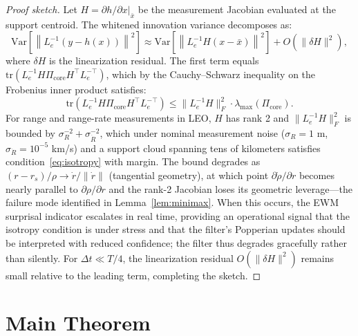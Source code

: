\documentclass[12pt]{article}
\begin{document}
\begin{proof}[Proof sketch]
Let $H = \partial h/\partial x|_{\bar{x}}$ be the measurement Jacobian evaluated at the support centroid. The whitened innovation variance decomposes as:
\[
\mathrm{Var}\!\left[\left\|L_e^{-1}(y - h(x))\right\|^2\right] \approx \mathrm{Var}\!\left[\left\|L_e^{-1}H(x - \bar{x})\right\|^2\right] + O(\|\delta H\|^2),
\]
where $\delta H$ is the linearization residual. The first term equals $\mathrm{tr}(L_e^{-1}H\Pi_{\mathrm{core}}H^\top L_e^{-\top})$, which by the Cauchy--Schwarz inequality on the Frobenius inner product satisfies:
\[
\mathrm{tr}(L_e^{-1}H\Pi_{\mathrm{core}}H^\top L_e^{-\top}) \leq \|L_e^{-1}H\|_F^2 \cdot \lambda_{\max}(\Pi_{\mathrm{core}}).
\]
For range and range-rate measurements in LEO, $H$ has rank 2 and $\|L_e^{-1}H\|_F^2$ is bounded by $\sigma_R^{-2} + \sigma_{\dot{R}}^{-2}$, which under nominal measurement noise ($\sigma_R = 1$ m, $\sigma_{\dot{R}} = 10^{-5}$ km/s) and a support cloud spanning tens of kilometers satisfies condition~\eqref{eq:isotropy} with margin. The bound degrades as $(r - r_s)/\rho \to \dot{r}/\|\dot{r}\|$ (tangential geometry), at which point $\partial\dot{\rho}/\partial r$ becomes nearly parallel to $\partial\rho/\partial r$ and the rank-2 Jacobian loses its geometric leverage---the failure mode identified in Lemma~\ref{lem:minimax}. When this occurs, the EWM surprisal indicator escalates in real time, providing an operational signal that the isotropy condition is under stress and that the filter's Popperian updates should be interpreted with reduced confidence; the filter thus degrades gracefully rather than silently. For $\Delta t \ll T/4$, the linearization residual $O(\|\delta H\|^2)$ remains small relative to the leading term, completing the sketch.
\end{proof}

\section{Main Theorem}
\label{sec:theorem}
\end{document}

